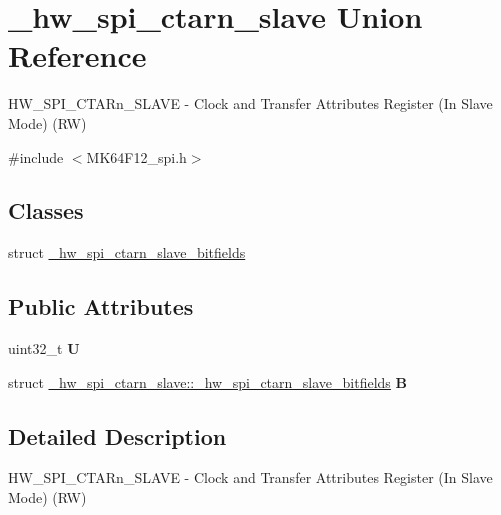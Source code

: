 \hypertarget{union__hw__spi__ctarn__slave}{}\section{\+\_\+hw\+\_\+spi\+\_\+ctarn\+\_\+slave Union Reference}
\label{union__hw__spi__ctarn__slave}


H\+W\+\_\+\+S\+P\+I\+\_\+\+C\+T\+A\+Rn\+\_\+\+S\+L\+A\+VE -\/ Clock and Transfer Attributes Register (In Slave Mode) (RW)  




{\ttfamily \#include $<$M\+K64\+F12\+\_\+spi.\+h$>$}

\subsection*{Classes}
\begin{DoxyCompactItemize}
\item 
struct \hyperlink{struct__hw__spi__ctarn__slave_1_1__hw__spi__ctarn__slave__bitfields}{\+\_\+hw\+\_\+spi\+\_\+ctarn\+\_\+slave\+\_\+bitfields}
\end{DoxyCompactItemize}
\subsection*{Public Attributes}
\begin{DoxyCompactItemize}
\item 
uint32\+\_\+t {\bfseries U}\hypertarget{union__hw__spi__ctarn__slave_a747f7bbd0ab55b72bafe2e228e3137b8}{}\label{union__hw__spi__ctarn__slave_a747f7bbd0ab55b72bafe2e228e3137b8}

\item 
struct \hyperlink{struct__hw__spi__ctarn__slave_1_1__hw__spi__ctarn__slave__bitfields}{\+\_\+hw\+\_\+spi\+\_\+ctarn\+\_\+slave\+::\+\_\+hw\+\_\+spi\+\_\+ctarn\+\_\+slave\+\_\+bitfields} {\bfseries B}\hypertarget{union__hw__spi__ctarn__slave_abc35f224d7c9a03ed61390f7120c565c}{}\label{union__hw__spi__ctarn__slave_abc35f224d7c9a03ed61390f7120c565c}

\end{DoxyCompactItemize}


\subsection{Detailed Description}
H\+W\+\_\+\+S\+P\+I\+\_\+\+C\+T\+A\+Rn\+\_\+\+S\+L\+A\+VE -\/ Clock and Transfer Attributes Register (In Slave Mode) (RW) 

